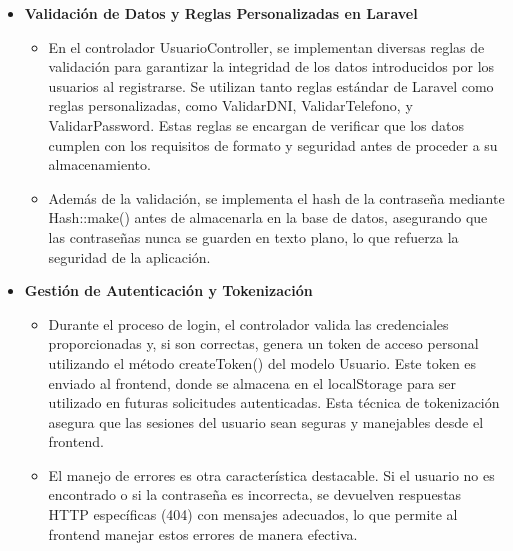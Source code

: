 \begin{itemize}
    \item \textbf{Validación de Datos y Reglas Personalizadas en Laravel} 

    \begin{itemize}
        \item En el controlador UsuarioController, se implementan diversas reglas de validación para garantizar la integridad de los datos introducidos por los usuarios al registrarse. Se utilizan tanto reglas estándar de Laravel como reglas personalizadas, como ValidarDNI, ValidarTelefono, y ValidarPassword. Estas reglas se encargan de verificar que los datos cumplen con los requisitos de formato y seguridad antes de proceder a su almacenamiento.
        
        
        \item Además de la validación, se implementa el hash de la contraseña mediante Hash::make() antes de almacenarla en la base de datos, asegurando que las contraseñas nunca se guarden en texto plano, lo que refuerza la seguridad de la aplicación.
        
    \end{itemize}

    \vspace{0.5cm}
    
    \item \textbf{Gestión de Autenticación y Tokenización} 

    \begin{itemize}
        \item Durante el proceso de login, el controlador valida las credenciales proporcionadas y, si son correctas, genera un token de acceso personal utilizando el método createToken() del modelo Usuario. Este token es enviado al frontend, donde se almacena en el localStorage para ser utilizado en futuras solicitudes autenticadas. Esta técnica de tokenización asegura que las sesiones del usuario sean seguras y manejables desde el frontend.
        
        
        \item El manejo de errores es otra característica destacable. Si el usuario no es encontrado o si la contraseña es incorrecta, se devuelven respuestas HTTP específicas (404) con mensajes adecuados, lo que permite al frontend manejar estos errores de manera efectiva.
        
    \end{itemize}

    \vspace{0.5cm}
    

\end{itemize}

